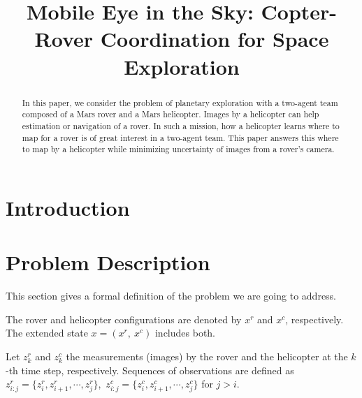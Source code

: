 \documentclass[conference]{IEEEtran}
\begin{document}
\title{\huge Mobile Eye in the Sky: Copter-Rover Coordination for Space Exploration}


\maketitle

\begin{abstract}
In this paper, we consider the problem of planetary exploration with a two-agent team composed of a Mars rover and a Mars helicopter. Images by a helicopter can help estimation or navigation of a rover. In such a mission, how a helicopter learns where to map for a rover is of great interest in a two-agent team. 
This paper answers this where to map by a helicopter while minimizing uncertainty of images from a rover’s camera.
\end{abstract}

\IEEEpeerreviewmaketitle

\section{Introduction}


\section{Problem Description}
This section gives a formal definition of the problem we are going to address. 

The rover and helicopter configurations are denoted by $x^r$ and $x^c$, respectively. The extended state $x=(x^r,~x^c)$ includes both.

Let $z^r_k$ and $z^c_k$ the measurements (images) by the rover and the helicopter at the $k$-th time step, respectively. Sequences of observations are defined as $z^r_{i:j}=\{z^r_i,z^r_{i+1},\cdots,z^r_j\}$,~$z^c_{i:j}=\{z^c_i,z^c_{i+1},\cdots,z^c_j\}$ for $j>i$.
\end{document}
